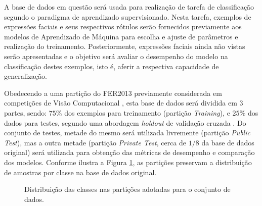 A base de dados em questão será usada para realização de tarefa de classificação segundo o paradigma de aprendizado supervisionado. Nesta tarefa, exemplos de expressões faciais e seus respectivos rótulos serão fornecidos previamente aos modelos de Aprendizado de Máquina para escolha e ajuste de parâmetros e realização do treinamento. Posteriormente, expressões faciais ainda não vistas serão apresentadas e o objetivo será avaliar o desempenho do modelo na classificação destes exemplos, isto é, aferir a respectiva capacidade de generalização.

Obedecendo a uma partição do FER2013 previamente considerada em competições de Visão Computacional \cite{Kaggle:FER2013}, esta base de dados será dividida em $3$ partes, sendo: $75\%$ dos exemplos para treinamento (partição \emph{Training}), e $25\%$ dos dados para testes, segundo uma abordagem \emph{holdout} de validação cruzada \cite{Brink:MachineLearningLivro}.  Do conjunto de testes, metade do mesmo será utilizada livremente (partição \emph{Public Test}), mas a outra metade (partição \emph{Private Test}, cerca de $1/8$ da base de dados original) será utilizada para obtenção das métricas de desempenho e comparação dos modelos. Conforme ilustra a Figura \ref{fig:particoes}, as partições preservam a distribuição de amostras por classe na base de dados original.

\begin{figure}[h!]
	\centering
  	\caption{Distribuição das classes nas partições adotadas para o conjunto de dados.} \label{fig:particoes}
\end{figure}

